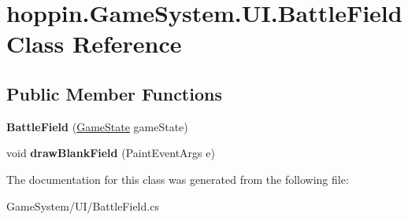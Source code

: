\hypertarget{classhoppin_1_1_game_system_1_1_u_i_1_1_battle_field}{}\section{hoppin.\+Game\+System.\+U\+I.\+Battle\+Field Class Reference}
\label{classhoppin_1_1_game_system_1_1_u_i_1_1_battle_field}
\subsection*{Public Member Functions}
\begin{DoxyCompactItemize}
\item 
{\bfseries Battle\+Field} (\hyperlink{classhoppin_1_1_game_system_1_1_game_state}{Game\+State} game\+State)\hypertarget{classhoppin_1_1_game_system_1_1_u_i_1_1_battle_field_ad004f0d20da5a52cdbae4e0a775e9136}{}\label{classhoppin_1_1_game_system_1_1_u_i_1_1_battle_field_ad004f0d20da5a52cdbae4e0a775e9136}

\item 
void {\bfseries draw\+Blank\+Field} (Paint\+Event\+Args e)\hypertarget{classhoppin_1_1_game_system_1_1_u_i_1_1_battle_field_a3e68abe57917a30fa2710d58ece951c8}{}\label{classhoppin_1_1_game_system_1_1_u_i_1_1_battle_field_a3e68abe57917a30fa2710d58ece951c8}

\end{DoxyCompactItemize}


The documentation for this class was generated from the following file\+:\begin{DoxyCompactItemize}
\item 
Game\+System/\+U\+I/Battle\+Field.\+cs\end{DoxyCompactItemize}
